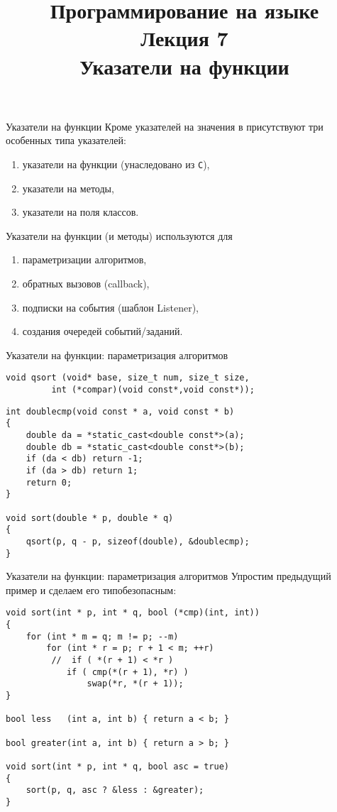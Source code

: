 \documentclass[aspectration=1610,t]{beamer}
\title{{\bf Программирование на языке \langcpp\protect\\Лекция
7\protect\vspace{1em}\\}Указатели на функции}
\begin{document}
\begin{frame} 
  \titlepage
\end{frame}

\begin{frame}[fragile]{Указатели на функции}
    Кроме указателей на значения в \langcpp присутствуют три особенных 
    типа указателей:
    \begin{enumerate}
        \item указатели на функции (унаследовано из \texttt{C}),
        \item указатели на методы,
        \item указатели на поля классов.
    \end{enumerate}
    
    \medskip\pause
    Указатели на функции (и методы) используются для
    \begin{enumerate}
        \item параметризации алгоритмов,
        \item обратных вызовов (callback),
        \item подписки на события (шаблон Listener),
        \item создания очередей событий/заданий.
    \end{enumerate}
\end{frame}

\begin{frame}[fragile]{Указатели на функции: параметризация алгоритмов}
    \begin{lstlisting}
void qsort (void* base, size_t num, size_t size,
         int (*compar)(void const*,void const*));
    \end{lstlisting}
    \begin{lstlisting}
int doublecmp(void const * a, void const * b) 
{ 
    double da = *static_cast<double const*>(a);
    double db = *static_cast<double const*>(b);
    if (da < db) return -1;
    if (da > db) return 1;
    return 0;
}

void sort(double * p, double * q) 
{
    qsort(p, q - p, sizeof(double), &doublecmp);
}
    \end{lstlisting}
\end{frame}

\begin{frame}[fragile]{Указатели на функции: параметризация алгоритмов}
Упростим предыдущий пример и сделаем его типобезопасным:
    \begin{lstlisting}
void sort(int * p, int * q, bool (*cmp)(int, int)) 
{
    for (int * m = q; m != p; --m)
        for (int * r = p; r + 1 < m; ++r)
         //  if ( *(r + 1) < *r )
            if ( cmp(*(r + 1), *r) )
                swap(*r, *(r + 1));
}

bool less   (int a, int b) { return a < b; }

bool greater(int a, int b) { return a > b; }

void sort(int * p, int * q, bool asc = true)
{
    sort(p, q, asc ? &less : &greater);
}
    \end{lstlisting}
\end{frame}
\end{document}
